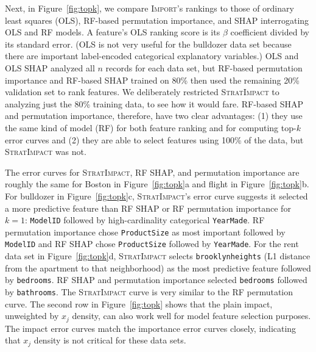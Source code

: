 \documentclass[11pt]{article}
\newcommand{\figref}[1]{Figure~\ref{#1}}
\newcommand{\Impo}{\fontfamily{cmr}\textsc{Import}}
\newcommand{\simp}{\fontfamily{cmr}\textsc{\small StratImpact}}
\begin{document}
Next, in \figref{fig:topk}, we compare \Impo{}'s rankings to those of ordinary least squares (OLS), RF-based permutation importance, and SHAP interrogating OLS and RF models. A feature's OLS ranking score is its $\beta$ coefficient divided by its standard error. (OLS is not very useful for the bulldozer data set because there are important label-encoded categorical explanatory variables.) OLS and OLS SHAP analyzed all $n$ records for each data set, but RF-based permutation importance and RF-based SHAP trained on 80\% then used the remaining 20\% validation set to rank features. We deliberately restricted \simp{} to analyzing just the 80\% training data, to see how it would fare. RF-based SHAP and permutation importance, therefore, have two clear advantages: (1) they use the same kind of model (RF) for both feature ranking and for computing top-$k$ error curves and (2) they are able to select features using 100\% of the data, but \simp{} was not.

The error curves for \simp, RF SHAP, and permutation importance are roughly the same for Boston in \figref{fig:topk}a and flight in \figref{fig:topk}b. For bulldozer in \figref{fig:topk}c, \simp's error curve suggests it selected a more predictive feature than RF SHAP or RF permutation importance for $k=1$: {\tt ModelID}  followed by high-cardinality categorical {\tt YearMade}. RF permutation importance chose {\tt ProductSize} as most important followed by {\tt ModelID} and RF SHAP chose {\tt ProductSize} followed by {\tt YearMade}. For the rent data set in \figref{fig:topk}d, \simp{} selects {\tt brooklynheights} (L1 distance from the apartment to that neighborhood) as the most predictive feature followed by {\tt bedrooms}.  RF SHAP and permutation importance selected {\tt bedrooms} followed by {\tt bathrooms}.  The \simp{} curve is very similar to the RF permutation curve.   The second row in \figref{fig:topk} shows that the plain impact, unweighted by $x_j$ density, can also work well for model feature selection purposes.  The impact error curves match the importance error curves closely, indicating that $x_j$ density is not critical for these data sets.
\end{document}
